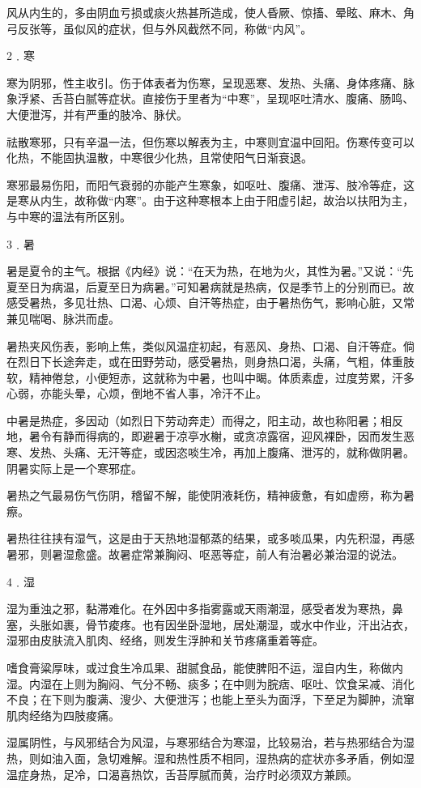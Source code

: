 \documentclass[a4paper,12pt,UTF8,twoside]{ctexbook}
\begin{document}
风从内生的，多由阴血亏损或痰火热甚所造成，使人昏厥、惊搐、晕眩、麻木、角弓反张等，虽似风的症状，但与外风截然不同，称做“内风”。

2﹒寒

寒为阴邪，性主收引。伤于体表者为伤寒，呈现恶寒、发热、头痛、身体疼痛、脉象浮紧、舌苔白腻等症状。直接伤于里者为“中寒”，呈现呕吐清水、腹痛、肠鸣、大便泄泻，并有严重的肢冷、脉伏。

祛散寒邪，只有辛温一法，但伤寒以解表为主，中寒则宜温中回阳。伤寒传变可以化热，不能固执温散，中寒很少化热，且常使阳气日渐衰退。

寒邪最易伤阳，而阳气衰弱的亦能产生寒象，如呕吐、腹痛、泄泻、肢冷等症，这是寒从内生，故称做“内寒”。由于这种寒根本上由于阳虚引起，故治以扶阳为主，与中寒的温法有所区别。

3﹒暑

暑是夏令的主气。根据《内经》说：“在天为热，在地为火，其性为暑。”又说：“先夏至日为病温，后夏至日为病暑。”可知暑病就是热病，仅是季节上的分别而已。故感受暑热，多见壮热、口渴、心烦、自汗等热症，由于暑热伤气，影响心脏，又常兼见喘喝、脉洪而虚。

暑热夹风伤表，影响上焦，类似风温症初起，有恶风、身热、口渴、自汗等症。倘在烈日下长途奔走，或在田野劳动，感受暑热，则身热口渴，头痛，气粗，体重肢软，精神倦怠，小便短赤，这就称为中暑，也叫中暍。体质素虚，过度劳累，汗多心弱，亦能头晕，心烦，倒地不省人事，冷汗不止。

中暑是热症，多因动（如烈日下劳动奔走）而得之，阳主动，故也称阳暑；相反地，暑令有静而得病的，即避暑于凉亭水榭，或贪凉露宿，迎风裸卧，因而发生恶寒、发热、头痛、无汗等症，或因恣啖生冷，再加上腹痛、泄泻的，就称做阴暑。阴暑实际上是一个寒邪症。

暑热之气最易伤气伤阴，稽留不解，能使阴液耗伤，精神疲惫，有如虚痨，称为暑瘵。

暑热往往挟有湿气，这是由于天热地湿郁蒸的结果，或多啖瓜果，内先积湿，再感暑邪，则暑湿愈盛。故暑症常兼胸闷、呕恶等症，前人有治暑必兼治湿的说法。

4﹒湿

湿为重浊之邪，黏滞难化。在外因中多指雾露或天雨潮湿，感受者发为寒热，鼻塞，头胀如裹，骨节痠疼。也有因坐卧湿地，居处潮湿，或水中作业，汗出沾衣，湿邪由皮肤流入肌肉、经络，则发生浮肿和关节疼痛重着等症。

嗜食膏粱厚味，或过食生冷瓜果、甜腻食品，能使脾阳不运，湿自内生，称做内湿。内湿在上则为胸闷、气分不畅、痰多；在中则为脘痞、呕吐、饮食呆减、消化不良；在下则为腹满、溲少、大便泄泻；也能上至头为面浮，下至足为脚肿，流窜肌肉经络为四肢痠痛。

湿属阴性，与风邪结合为风湿，与寒邪结合为寒湿，比较易治，若与热邪结合为湿热，则如油入面，急切难解。湿和热性质不相同，湿热病的症状亦多矛盾，例如湿温症身热，足冷，口渴喜热饮，舌苔厚腻而黄，治疗时必须双方兼顾。
\end{document}
